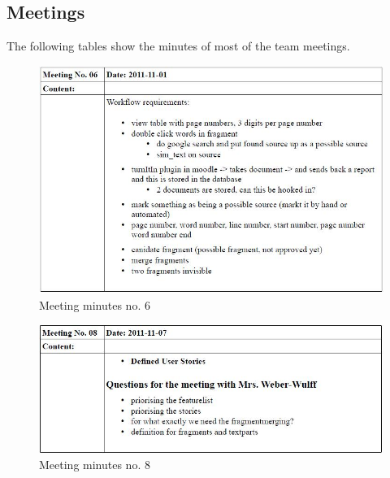 \begin{appendix}

\chapter{Meetings}\label{ch:Meetings}
The following tables show the minutes of most of the team meetings.

\begin{figure}[htbp]
  \centering
    \includegraphics[width=\textwidth]{images/a_meetings/meeting_6}
  \caption{Meeting minutes no. 6}
  \label{fig:meeting minutes no. 6}
\end{figure}

\begin{figure}[htbp]
  \centering
    \includegraphics[width=\textwidth]{images/a_meetings/meeting_8}
  \caption{Meeting minutes no. 8}
  \label{fig:meeting minutes no. 8}
\end{figure}


\end{appendix}
